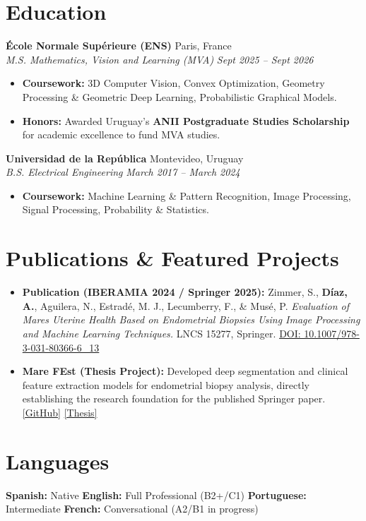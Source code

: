 \documentclass[10pt, a4paper]{article}
\newcommand{\entryheader}[4]{
    \noindent \textbf{#1} \hfill #2 \\
    \textit{#3} \hfill \textit{#4} \vspace{1pt}
}
\begin{document}
\section{Education}

\entryheader{École Normale Supérieure (ENS)}{Paris, France}{M.S. Mathematics, Vision and Learning (MVA)}{Sept 2025 -- Sept 2026}
\begin{itemize}
    \item \textbf{Coursework:} 3D Computer Vision, Convex Optimization, Geometry Processing \& Geometric Deep Learning, Probabilistic Graphical Models.
    \item \textbf{Honors:} Awarded Uruguay's \textbf{ANII Postgraduate Studies Scholarship} for academic excellence to fund MVA studies.
\end{itemize}
\vspace{3pt}

\entryheader{Universidad de la República}{Montevideo, Uruguay}{B.S. Electrical Engineering}{March 2017 -- March 2024}
\begin{itemize}
    \item \textbf{Coursework:} Machine Learning \& Pattern Recognition, Image Processing, Signal Processing, Probability \& Statistics.
\end{itemize}

\section{Publications \& Featured Projects}
\begin{itemize}
    \item \textbf{Publication (IBERAMIA 2024 / Springer 2025):} Zimmer, S., \textbf{Díaz, A.}, Aguilera, N., Estradé, M. J., Lecumberry, F., \& Musé, P. \textit{Evaluation of Mares Uterine Health Based on Endometrial Biopsies Using Image Processing and Machine Learning Techniques.} LNCS 15277, Springer. \href{https://doi.org/10.1007/978-3-031-80366-6_13}{DOI: 10.1007/978-3-031-80366-6\_13}
    \item \textbf{Mare FEst (Thesis Project):} Developed deep segmentation and clinical feature extraction models for endometrial biopsy analysis, directly establishing the research foundation for the published Springer paper. \href{https://github.com/Peregalli/MareFEst}{[GitHub]} \textbar{} \href{https://hdl.handle.net/20.500.12008/43668}{[Thesis]}
\end{itemize}

\section{Languages}
\textbf{Spanish:} Native \quad \textbar{} \quad \textbf{English:} Full Professional (B2+/C1) \quad \textbar{} \quad \textbf{Portuguese:} Intermediate \quad \textbar{} \quad \textbf{French:} Conversational (A2/B1 in progress)
\end{document}
